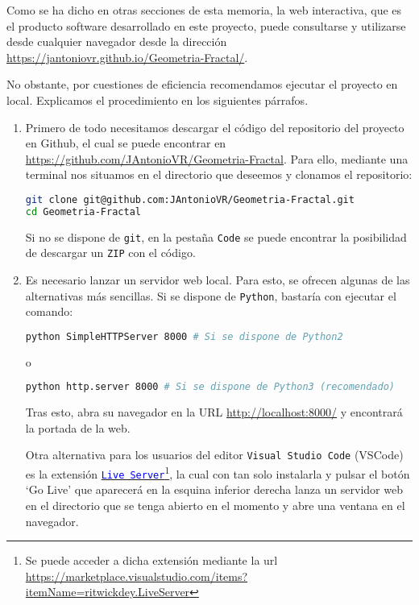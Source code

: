 Como se ha dicho en otras secciones de esta memoria, la web interactiva, que es el producto software desarrollado en este proyecto, puede consultarse y utilizarse desde cualquier navegador desde la dirección \url{https://jantoniovr.github.io/Geometria-Fractal/}.

No obstante, por cuestiones de eficiencia recomendamos ejecutar el
proyecto en local. Explicamos el procedimiento en los siguientes
párrafos.

\begin{enumerate}
\def\labelenumi{\arabic{enumi}.}
\item
  Primero de todo necesitamos descargar el código del repositorio del proyecto en Github, el cual se puede encontrar en \url{https://github.com/JAntonioVR/Geometria-Fractal}. Para ello, mediante una terminal nos situamos en el directorio que deseemos y clonamos el repositorio:

  \begin{lstlisting}[language=bash]
git clone git@github.com:JAntonioVR/Geometria-Fractal.git
cd Geometria-Fractal
  \end{lstlisting}

  Si no se dispone de \texttt{git}, en la pestaña \texttt{Code} se puede encontrar la posibilidad de descargar un \texttt{ZIP} con el código.

\item
  Es necesario lanzar un servidor web local. Para esto, se ofrecen algunas de las alternativas más sencillas. Si se dispone de
  \texttt{Python}, bastaría con ejecutar el comando:

  \begin{lstlisting}[language=bash]
python SimpleHTTPServer 8000 # Si se dispone de Python2
  \end{lstlisting}

  o

  \begin{lstlisting}[language=bash]
python http.server 8000 # Si se dispone de Python3 (recomendado)
  \end{lstlisting}
  
  Tras esto, abra su navegador en la URL \url{http://localhost:8000/} y encontrará la portada de la web.

  Otra alternativa para los usuarios del editor \texttt{Visual\ Studio\ Code} (VSCode) es la extensión \href{https://marketplace.visualstudio.com/items?itemName=ritwickdey.LiveServer}{\textcolor{blue}{\texttt{Live\ Server}}}\footnote{Se puede acceder a dicha extensión mediante la url \url{https://marketplace.visualstudio.com/items?itemName=ritwickdey.LiveServer}}, la cual con tan solo instalarla y pulsar el botón `Go Live' que aparecerá en la esquina inferior derecha lanza un servidor web en el directorio que se tenga abierto en el momento y abre una ventana en el navegador.


\end{enumerate}
